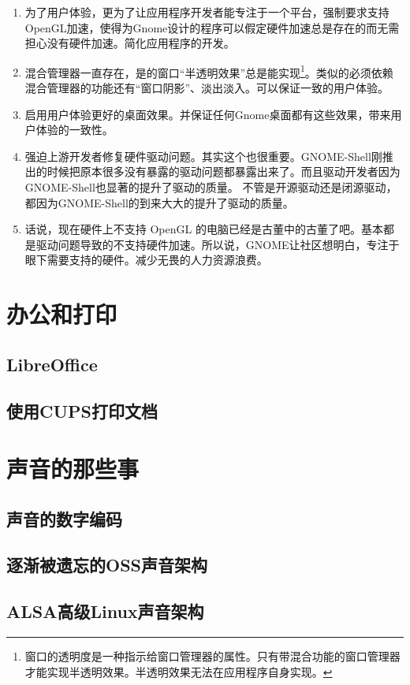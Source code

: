\begin{enumerate}
\item 为了用户体验，更为了让应用程序开发者能专注于一个平台，强制要求支持OpenGL加速，使得为Gnome设计的程序可以假定硬件加速总是存在的而无需担心没有硬件加速。简化应用程序的开发。
\item 混合管理器一直存在，是的窗口“半透明效果”总是能实现\footnote{窗口的透明度是一种指示给窗口管理器的属性。只有带混合功能的窗口管理器才能实现半透明效果。半透明效果无法在应用程序自身实现。}。类似的必须依赖混合管理器的功能还有“窗口阴影”、淡出淡入。可以保证一致的用户体验。
\item 启用用户体验更好的桌面效果。并保证任何Gnome桌面都有这些效果，带来用户体验的一致性。
\item 强迫上游开发者修复硬件驱动问题。其实这个也很重要。GNOME-Shell刚推出的时候把原本很多没有暴露的驱动问题都暴露出来了。而且驱动开发者因为GNOME-Shell也显著的提升了驱动的质量。
不管是开源驱动还是闭源驱动，都因为GNOME-Shell的到来大大的提升了驱动的质量。

\item 话说，现在硬件上不支持 OpenGL 的电脑已经是古董中的古董了吧。基本都是驱动问题导致的不支持硬件加速。所以说，GNOME让社区想明白，专注于眼下需要支持的硬件。减少无畏的人力资源浪费。
\end{enumerate}



\section{办公和打印}
\subsection{LibreOffice}
\subsection{使用CUPS打印文档}
\section{声音的那些事}
\subsection{声音的数字编码}
\subsection{逐渐被遗忘的OSS声音架构}
\subsection{ALSA高级Linux声音架构}
